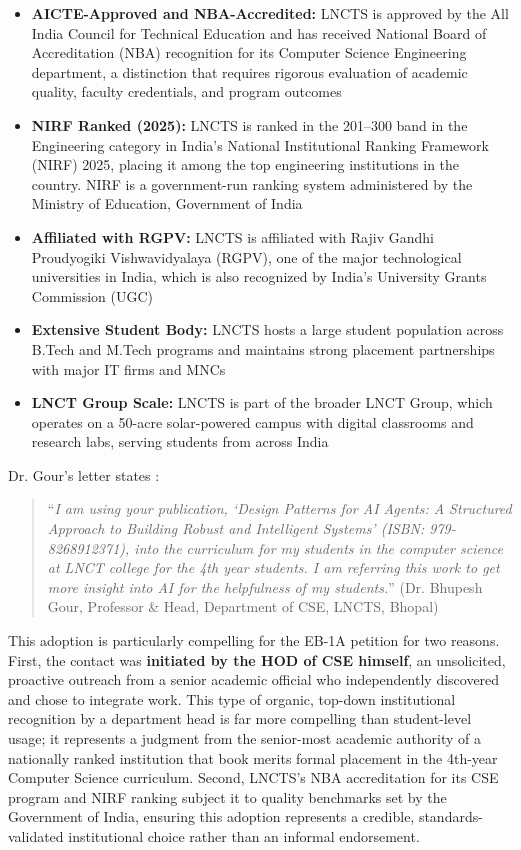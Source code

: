 \begin{itemize}
    \item \textbf{AICTE-Approved and NBA-Accredited:} LNCTS is approved by the All India Council for Technical Education and has received National Board of Accreditation (NBA) recognition for its Computer Science Engineering department, a distinction that requires rigorous evaluation of academic quality, faculty credentials, and program outcomes
    \item \textbf{NIRF Ranked (2025):} LNCTS is ranked in the 201--300 band in the Engineering category in India's National Institutional Ranking Framework (NIRF) 2025, placing it among the top engineering institutions in the country. NIRF is a government-run ranking system administered by the Ministry of Education, Government of India
    \item \textbf{Affiliated with RGPV:} LNCTS is affiliated with Rajiv Gandhi Proudyogiki Vishwavidyalaya (RGPV), one of the major technological universities in India, which is also recognized by India's University Grants Commission (UGC)
    \item \textbf{Extensive Student Body:} LNCTS hosts a large student population across B.Tech and M.Tech programs and maintains strong placement partnerships with major IT firms and MNCs
    \item \textbf{LNCT Group Scale:} LNCTS is part of the broader LNCT Group, which operates on a 50-acre solar-powered campus with digital classrooms and research labs, serving students from across India
\end{itemize}

Dr. Gour's letter states \cite{OR10}:

\begin{quote}
``\textit{I am using your publication, `Design Patterns for AI Agents: A Structured Approach to Building Robust and Intelligent Systems' (ISBN: 979-8268912371), into the curriculum for my students in the computer science at LNCT college for the 4th year students. I am referring this work to get more insight into AI for the helpfulness of my students.}'' (Dr. Bhupesh Gour, Professor \& Head, Department of CSE, LNCTS, Bhopal)
\end{quote}

This adoption is particularly compelling for the EB-1A petition for two reasons. First, the contact was \textbf{initiated by the HOD of CSE himself}, an unsolicited, proactive outreach from a senior academic official who independently discovered and chose to integrate \drs work. This type of organic, top-down institutional recognition by a department head is far more compelling than student-level usage; it represents a judgment from the senior-most academic authority of a nationally ranked institution that \drs book merits formal placement in the 4th-year Computer Science curriculum. Second, LNCTS's NBA accreditation for its CSE program and NIRF ranking subject it to quality benchmarks set by the Government of India, ensuring this adoption represents a credible, standards-validated institutional choice rather than an informal endorsement.

